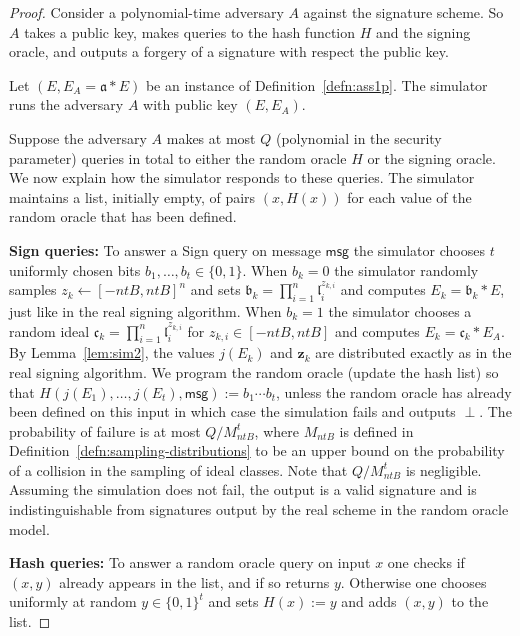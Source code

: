 \documentclass{llncs}
\newcommand{\msg}{\textsf{msg}}
\renewcommand{\a}{\mathfrak{a}}
\renewcommand{\b}{\mathfrak{b}}
\renewcommand{\c}{\mathfrak{c}}
\renewcommand{\l}{\mathfrak{l}}
\newcommand{\z}{\textbf{z}}
\begin{document}
\begin{proof}
Consider a polynomial-time adversary $A$ against the signature scheme. So $A$ takes a public key, makes queries to the hash function $H$ and the signing oracle, and outputs a forgery of a signature with respect the public key.

Let $(E, E_A = \a * E )$ be an instance of Definition~\ref{defn:ass1p}.
The simulator runs the adversary $A$ with public key $(E, E_A)$.

Suppose the adversary $A$ makes at most $Q$ (polynomial in the security parameter) queries in total to either the random oracle $H$ or the signing oracle. We now explain how the simulator responds to these queries. The simulator maintains a list, initially empty, of pairs $(x, H(x))$ for each value of the random oracle that has been defined.

\vskip 0.1cm

\noindent \textbf{Sign queries:}
To answer a Sign query on message $\msg$ the simulator chooses 
$t$ uniformly chosen bits $b_1, \dots, b_t \in \{0,1\}$.
When $b_k = 0$ the simulator randomly samples $z_k \leftarrow [-ntB,ntB]^n$ and sets $\b_k = \prod_{i=1}^n \l_i^{z_{k,i}}$ and computes $E_k = \b_k * E$, just like in the real signing algorithm.
When $b_k = 1$ the simulator chooses a random ideal $\c_k = \prod_{i=1}^n \l_i^{z_{k,i}}$ for $z_{k,i} \in [-ntB, ntB]$
and computes $E_k = \c_k * E_A$.
By Lemma~\ref{lem:sim2}, the values $j( E_k )$ and $\z_k$ are distributed exactly as in the real signing algorithm.
We program the random oracle (update the hash list) so that $H( j( E_1), \dots, j(E_t), \msg ) := b_1 \cdots b_t$, unless the random oracle has already been defined on this input in which case the simulation fails and outputs $\perp$.
The probability of failure is at most $Q/M_{ntB}^t$, 
where $M_{ntB}$ is defined in Definition~\ref{defn:sampling-distributions} to be an upper bound on the probability of a collision in the sampling of ideal classes.
Note that $Q/M_{ntB}^t$ is negligible.
Assuming the simulation does not fail, the output is a valid signature and is indistinguishable from signatures output by the real scheme in the random oracle model.

\vskip 0.1cm

\noindent \textbf{Hash queries:}
To answer a random oracle query on input $x$ one checks if $(x,y)$ already appears in the list, and if so returns $y$. Otherwise one chooses uniformly at random $y \in \{0,1\}^t$ and sets $H(x) := y$ and adds $(x,y)$ to the list.


\end{proof}
\end{document}
